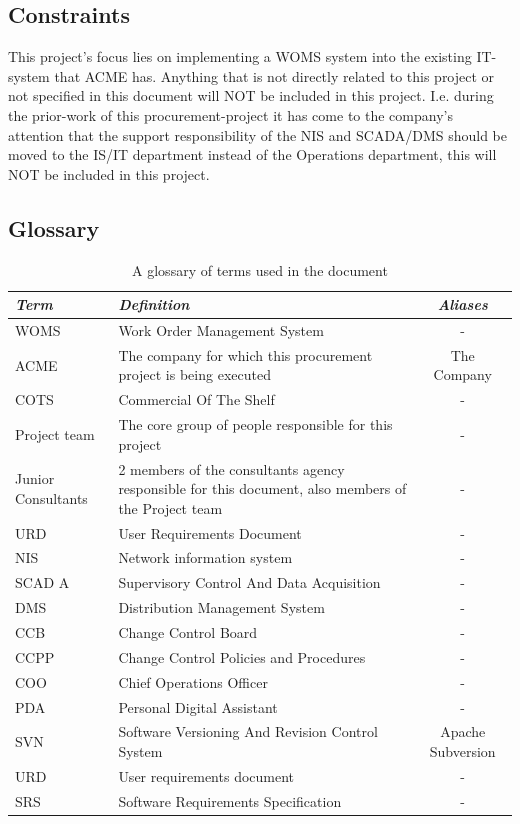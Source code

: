 \documentclass[a4paper]{article}
\begin{document}
\subsection{Constraints}
\label{sub:constraints}

This project's focus lies on implementing a WOMS system into the existing IT-system that ACME has. Anything that is not directly related to this project or not specified in this document will NOT be included in this project.  I.e. during the prior-work of this procurement-project it has come to the company's attention that the support responsibility of the NIS and SCADA/DMS should be moved to the IS/IT department instead of the Operations department, this will NOT be included in this project. 

\subsection{Glossary}
\label{sub:glossary}

\begin{table}[H]
	\centering
	\begin{tabular}{|p{2cm}| p{6cm} |c|}
	\hline
		\textit{Term} & \textit{Definition} & \textit{Aliases} \\
	\hline 
		
		WOMS	 & Work Order Management System & - \\ \hline	
		ACME	 & The company for which this procurement project is being executed& The Company \\	\hline
		COTS	 & Commercial Of The Shelf & -\\ \hline
		Project team & The core group of people responsible for this project & - \\ \hline
		Junior Consultants & 2 members of the consultants agency responsible for this document, also members of the Project team & - \\ \hline
		URD & User Requirements Document & -\\ \hline
		NIS	& Network information system & - \\	\hline	
		SCAD	A & Supervisory Control And Data Acquisition & -\\  \hline
		DMS & Distribution Management System & -\\ \hline
		CCB	& Change Control Board & -\\ \hline
		CCPP	 & Change Control Policies and Procedures & -\\ \hline
		COO	& Chief Operations Officer & -\\ \hline
		PDA	& Personal Digital Assistant & -\\ \hline
		SVN & Software Versioning And Revision Control System & Apache Subversion\\ \hline
		URD & User requirements document & -\\ \hline
		SRS & Software Requirements Specification & -\\ \hline

	\hline
	
	\end{tabular}
	\caption{A glossary of terms used in the document}
\end{table}
\end{document}
